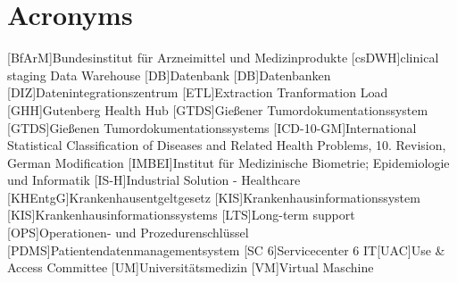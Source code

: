 \chapter*{Acronyms}
    \begin{acronym}[CDW]
    	
    	[BfArM]{Bundesinstitut für Arzneimittel und Medizinprodukte}
    	[csDWH]{clinical staging Data Warehouse}
    	[DB]{Datenbank}
	    	[DB]{Datenbanken}
    	[DIZ]{Datenintegrationszentrum} 
    	[ETL]{Extraction Tranformation Load}
    	[GHH]{Gutenberg Health Hub}
    	[GTDS]{Gießener Tumordokumentationssystem}
	    	{Gießenen Tumordokumentationssystems}	
    	[ICD-10-GM]{International Statistical Classification of Diseases and Related Health
    		Problems, 10. Revision, German Modification}
    	[IMBEI]{Institut für Medizinische Biometrie; Epidemiologie und Informatik}
    	[IS-H]{Industrial Solution - Healthcare}   	
		[KHEntgG]{Krankenhausentgeltgesetz}
    	[KIS]{Krankenhausinformationssystem}
			[KIS]{Krankenhausinformationssystems}
    	[LTS]{Long-term support} 
    	[OPS]{Operationen- und Prozedurenschlüssel}
    	[PDMS]{Patientendatenmanagementsystem}
    	[SC 6]{Servicecenter 6 IT}[UAC]{Use \& Access Committee}
    	[UM]{Universitätsmedizin}
    	[VM]{Virtual Maschine}
    \end{acronym}